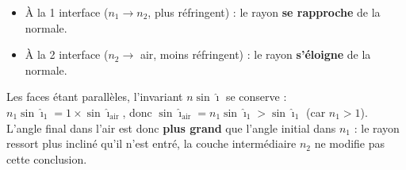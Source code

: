 \documentclass[11pt,a4paper]{article}
\begin{document}
\begin{corrige}
\begin{itemize}[leftmargin=1.4em,topsep=2pt,itemsep=1pt]
  \item À la 1\iere{} interface ($n_1\to n_2$, plus réfringent) : le rayon \textbf{se rapproche} de la
        normale.
  \item À la 2\ieme{} interface ($n_2\to$ air, moins réfringent) : le rayon \textbf{s'éloigne} de la
        normale.
\end{itemize}
Les faces étant parallèles, l'invariant $n\sin\hat{\imath}$ se conserve : $n_1\sin\hat{\imath}_1
=1\times\sin\hat{\imath}_{\text{air}}$, donc $\sin\hat{\imath}_{\text{air}}=n_1\sin\hat{\imath}_1
>\sin\hat{\imath}_1$ (car $n_1>1$). L'angle final dans l'air est donc \textbf{plus grand} que l'angle
initial dans $n_1$ : le rayon ressort plus incliné qu'il n'est entré, la couche intermédiaire $n_2$
ne modifie pas cette conclusion.
\end{corrige}
\end{document}
